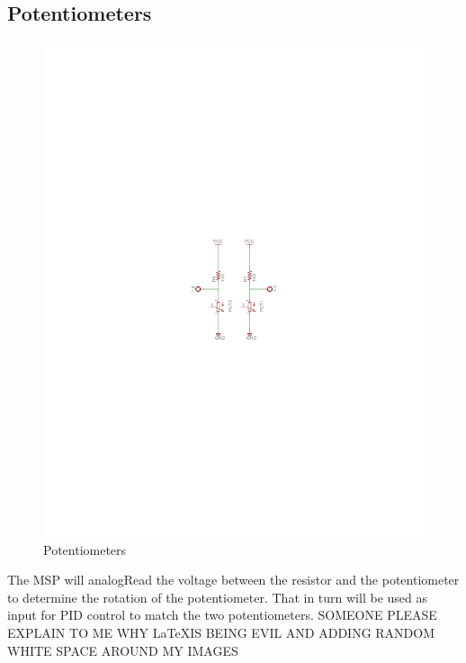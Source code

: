 \documentclass[a4paper, 11pt]{article}
\begin{document}
	\subsection{Potentiometers}
	\begin{figure}[!ht]
		\centering
		\vspace{-11cm}
		\includegraphics{report-images/potentiometers}
		\vspace{-11cm}
		\caption{Potentiometers}
	\end{figure}
	\noindent The MSP will analogRead the voltage between the resistor and the potentiometer to determine the rotation of the potentiometer.  That in turn will be used as input for PID control to match the two potentiometers.  SOMEONE PLEASE EXPLAIN TO ME WHY \LaTeX IS BEING EVIL AND ADDING RANDOM WHITE SPACE AROUND MY IMAGES
\end{document}
